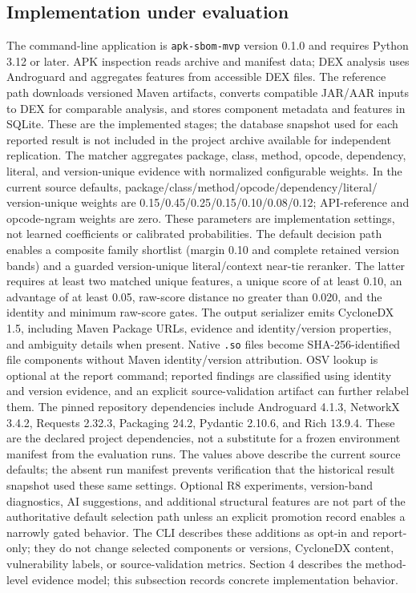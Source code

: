 \documentclass[10pt,twocolumn]{article}
\begin{document}
\subsection{Implementation under evaluation}
The command-line application is \texttt{apk-sbom-mvp} version 0.1.0 and requires Python 3.12 or later. APK inspection reads archive and manifest data; DEX analysis uses Androguard and aggregates features from accessible DEX files. The reference path downloads versioned Maven artifacts, converts compatible JAR/AAR inputs to DEX for comparable analysis, and stores component metadata and features in SQLite. These are the implemented stages; the database snapshot used for each reported result is not included in the project archive available for independent replication.
The matcher aggregates package, class, method, opcode, dependency, literal, and version-unique evidence with normalized configurable weights. In the current source defaults, package/class/method/opcode/dependency/literal/ version-unique weights are 0.15/0.45/0.25/0.15/0.10/0.08/0.12; API-reference and opcode-ngram weights are zero. These parameters are implementation settings, not learned coefficients or calibrated probabilities. The default decision path enables a composite family shortlist (margin 0.10 and complete retained version bands) and a guarded version-unique literal/context near-tie reranker. The latter requires at least two matched unique features, a unique score of at least 0.10, an advantage of at least 0.05, raw-score distance no greater than 0.020, and the identity and minimum raw-score gates.
The output serializer emits CycloneDX 1.5, including Maven Package URLs, evidence and identity/version properties, and ambiguity details when present. Native \texttt{.so} files become SHA-256-identified file components without Maven identity/version attribution. OSV lookup is optional at the report command; reported findings are classified using identity and version evidence, and an explicit source-validation artifact can further relabel them. The pinned repository dependencies include Androguard 4.1.3, NetworkX 3.4.2, Requests 2.32.3, Packaging 24.2, Pydantic 2.10.6, and Rich 13.9.4. These are the declared project dependencies, not a substitute for a frozen environment manifest from the evaluation runs. The values above describe the current source defaults; the absent run manifest prevents verification that the historical result snapshot used these same settings.
Optional R8 experiments, version-band diagnostics, AI suggestions, and additional structural features are not part of the authoritative default selection path unless an explicit promotion record enables a narrowly gated behavior. The CLI describes these additions as opt-in and report-only; they do not change selected components or versions, CycloneDX content, vulnerability labels, or source-validation metrics. Section 4 describes the method-level evidence model; this subsection records concrete implementation behavior.
\end{document}
